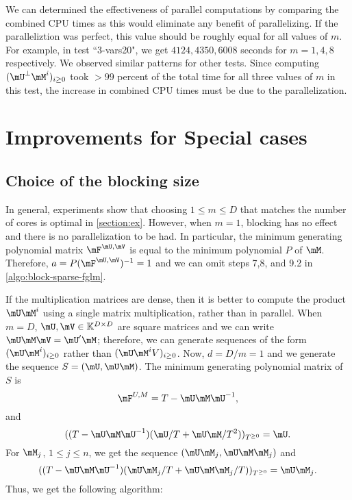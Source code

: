 \documentclass[12pt]{article}
\begin{document}
We can determined the effectiveness of parallel computations by comparing
the combined CPU times as this would eliminate any benefit of parallelizing. 
If the paralleliztion was perfect, this value should be roughly equal
for all values of $m$. For example, in test ``3-vars20", we get
$4124, 4350, 6008$ seconds for $m=1,4,8$ respectively. We observed similar
patterns for other tests. Since computing $(\mU^{\perp} \mM^i)_{i\ge0}$ took
$> 99$ percent of the total time for all three values of $m$ in this test,
the increase in combined CPU times must be due to the parallelization.



\newpage
\section{Improvements for Special cases}
\subsection{Choice of the blocking size}
In general, experiments show that choosing $1 \le m \le D$ that matches
the number of cores is optimal in \cref{section:ex}. However,
when $m=1$, blocking has no effect and there is no parallelization
to be had. In particular, the minimum generating polynomial matrix
$\mF^{\mU,\mV}$ is equal to the minimum polynomial $P$ of $\mM$. Therefore,
$a = P (\mF^{\mU,\mV})^{-1} = 1$ and we can omit steps 7,8, and 9.2 in
\cref{algo:block-sparse-fglm}.

If the multiplication matrices are dense, then it is
better to compute the product $\mU \mM^i$ using a single matrix multiplication,
rather than in parallel.
When $m = D$, $\mU,\mV \in \mathbb{K}^{D \times D}$ are square matrices
and we can write $\mU\mM\mV = \mU'\mM$; therefore, we can generate sequences of the
form $(\mU\mM^i)_{i\ge0}$ rather than $(\mU\mM^iV)_{i\ge0}$. Now, $d = D/m = 1$
and we generate the sequence $ S = (\mU, \mU\mM)$. The minimum generating polynomial
matrix of $S$ is 
$$\mF^{U,M} = T - \mU\mM\mU^{-1},$$ 
and 
$$((T - \mU\mM\mU^{-1})(\mU/T + \mU\mM/T^2))_{T^{\ge 0}} = \mU. $$
For $\mM_j$, $1 \le j \le n$, we get the sequence $(\mU\mM_j,\mU\mM\mM_j)$ and
$$((T - \mU\mM\mU^{-1})(\mU\mM_j/T + \mU\mM\mM_j/T))_{T^{\ge 0}} = \mU\mM_j.$$
Thus, we get the following algorithm:
\end{document}
